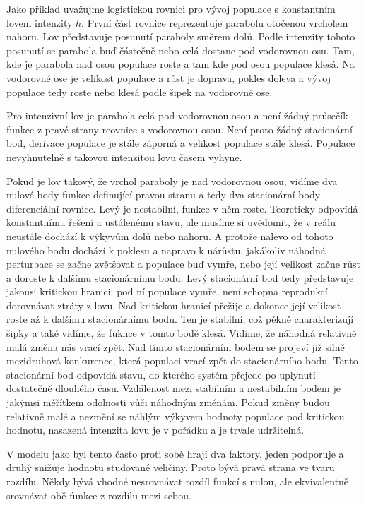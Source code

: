 \documentclass[12pt]{article}
\begin{document}
Jako příklad uvažujme logistickou rovnici pro vývoj populace s konstantním lovem intenzity $h$. První část rovnice reprezentuje parabolu otočenou vrcholem nahoru. Lov představuje posunutí paraboly směrem dolů. Podle intenzity tohoto posunutí se parabola buď částečně nebo celá dostane pod vodorovnou osu. Tam, kde je parabola nad osou populace roste a tam kde pod osou populace klesá. Na vodorovné ose je velikost populace a růst je doprava, pokles doleva a vývoj populace tedy roste nebo klesá podle šipek na vodorovné ose.

Pro intenzivní lov je parabola celá pod vodorovnou osou a není žádný průsečík funkce z pravé strany reovnice s vodorovnou osou. Není proto žádný stacionární bod, derivace populace je stále záporná a velikost populace stále klesá. Populace nevyhnutelně s takovou intenzitou lovu časem vyhyne.

Pokud je lov takový, že vrchol paraboly je nad vodorovnou osou, vidíme dva nulové body funkce definující pravou stranu a tedy dva stacionární body diferenciální rovnice. Levý je nestabilní, funkce v něm roste. Teoreticky odpovídá konstantnímu řešení a ustálenému stavu, ale musíme si uvědomit, že v reálu neustále dochází k výkyvům dolů nebo nahoru. A protože nalevo od tohoto nulového bodu dochází k poklesu a napravo k nárůstu, jakákoliv náhodná perturbace se začne zvětšovat a populace buď vymře, nebo její velikost začne růst a doroste k dalšímu stacionárnímu bodu. Levý stacionární bod tedy představuje jakousi kritickou hranici: pod ní populace vymře, není schopna reprodukcí dorovnávat ztráty z lovu. Nad kritickou hranicí přežije a dokonce její velikost roste až k dalšímu stacionárnímu bodu. Ten je stabilní, což pěkně charakterizují šipky a také vidíme, že fuknce v tomto bodě klesá. Vidíme, že náhodná relativně malá změna nás vrací zpět. Nad tímto stacionárním bodem se projeví již silně mezidruhová konkurence, která populaci vrací zpět do stacionárního bodu. Tento stacionární bod odpovídá stavu, do kterého systém přejede po uplynutí dostatečně dlouhého času. Vzdálenost mezi stabilním a nestabilním bodem je jakýmsi měřítkem odolnosti vůči náhodným změnám. Pokud změny budou relativně malé a nezmění se náhlým výkyvem hodnoty populace pod kritickou hodnotu, nasazená intenzita lovu je v pořádku a je trvale udržitelná. 

V modelu jako byl tento často proti sobě hrají dva faktory, jeden podporuje a druhý snižuje hodnotu studované veličiny. Proto bývá pravá strana ve tvaru rozdílu. Někdy bývá vhodné nesrovnávat rozdíl funkcí s nulou, ale ekvivalentně srovnávat obě funkce z rozdílu mezi sebou. 
\end{document}
